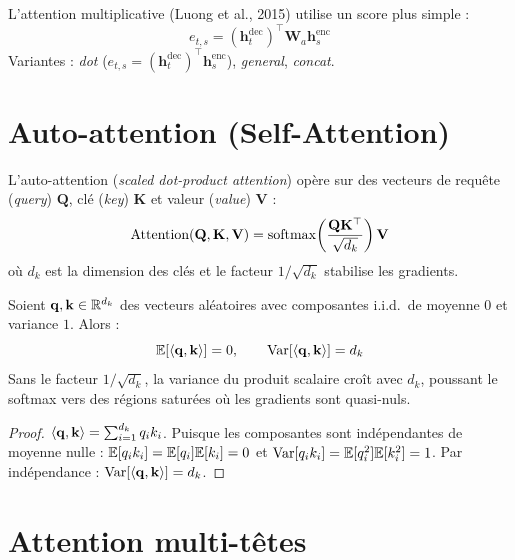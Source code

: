 \begin{definition}
L'attention multiplicative (Luong et al., 2015) utilise un score plus simple :
\[
e_{t,s} = (\mathbf{h}_t^{\text{dec}})^\top \mathbf{W}_a \mathbf{h}_s^{\text{enc}}
\]
Variantes : \emph{dot} ($e_{t,s} = (\mathbf{h}_t^{\text{dec}})^\top \mathbf{h}_s^{\text{enc}}$),
\emph{general}, \emph{concat}.
\end{definition}

\section{Auto-attention (Self-Attention)}
\label{sec:att:selfattention}

\begin{definition}
L'auto-attention (\emph{scaled dot-product attention}) op\`ere sur des
vecteurs de requ\^ete (\emph{query}) $\mathbf{Q}$, cl\'e (\emph{key})
$\mathbf{K}$ et valeur (\emph{value}) $\mathbf{V}$ :
\[
\text{Attention}(\mathbf{Q}, \mathbf{K}, \mathbf{V}) = \operatorname{softmax}\!\left(\frac{\mathbf{Q}\mathbf{K}^\top}{\sqrt{d_k}}\right) \mathbf{V}
\]
o\`u $d_k$ est la dimension des cl\'es et le facteur $1/\sqrt{d_k}$ stabilise
les gradients.
\end{definition}

\begin{theoreme}
Soient $\mathbf{q}, \mathbf{k} \in \mathbb{R}^{d_k}$ des vecteurs al\'eatoires avec
composantes i.i.d.\ de moyenne $0$ et variance $1$. Alors :
\[
\mathbb{E}[\langle \mathbf{q}, \mathbf{k} \rangle] = 0, \qquad \text{Var}[\langle \mathbf{q}, \mathbf{k} \rangle] = d_k
\]
Sans le facteur $1/\sqrt{d_k}$, la variance du produit scalaire cro\^it avec
$d_k$, poussant le softmax vers des r\'egions satur\'ees o\`u les gradients
sont quasi-nuls.
\end{theoreme}

\begin{proof}
$\langle \mathbf{q}, \mathbf{k} \rangle = \sum_{i=1}^{d_k} q_i k_i$. Puisque les
composantes sont ind\'ependantes de moyenne nulle :
$\mathbb{E}[q_i k_i] = \mathbb{E}[q_i]\mathbb{E}[k_i] = 0$ et
$\text{Var}[q_i k_i] = \mathbb{E}[q_i^2]\mathbb{E}[k_i^2] = 1$. Par ind\'ependance :
$\text{Var}[\langle \mathbf{q}, \mathbf{k} \rangle] = d_k$.
\end{proof}

\section{Attention multi-t\^etes}
\label{sec:att:multihead}

